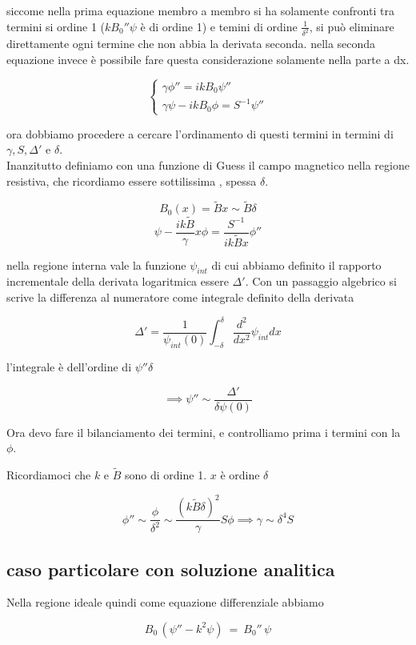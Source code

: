 siccome nella prima equazione membro a membro si ha solamente confronti tra termini si ordine 1 ($kB_0''\psi$ è di ordine 1) e temini di ordine $\frac{1}{\delta^2}$, si può eliminare direttamente ogni termine che non abbia la derivata seconda. nella seconda equazione invece è possibile fare  questa considerazione solamente nella parte a dx.

\[\begin{cases}
	\gamma\phi''=ikB_0\psi''\\\gamma\psi-ikB_0\phi=S^{-1}\psi''
\end{cases}\] 

ora dobbiamo procedere a cercare l'ordinamento di questi termini in termini di $\gamma, S, \Delta'  $ e $\delta$. \\Inanzitutto definiamo con una funzione di Guess il campo magnetico nella regione resistiva, che ricordiamo essere sottilissima , spessa $\delta$. 

\[B_0(x)=\tilde Bx\sim\tilde B\delta\]
\[\psi-\frac{ik\tilde B}{\gamma}x\phi=\frac{S^{-1}}{ik\tilde Bx}\phi''\] 

nella regione interna vale la funzione $\psi_{int}$ di cui abbiamo definito il rapporto incrementale della derivata logaritmica essere $\Delta'$. Con un passaggio algebrico si scrive la differenza al numeratore come integrale definito  della derivata 

\[\Delta'=\frac{1}{\psi_{int}(0)}\int_{-\delta}^{\delta}\frac{d^2}{dx^2}\psi_{int}dx\] 

l'integrale è dell'ordine di $\psi''\delta$

\[\implies\psi''\sim \frac{\Delta'}{\delta \psi(0)}\] 

Ora devo fare il bilanciamento dei termini, e controlliamo prima i termini con la $\phi$.         

Ricordiamoci che $k$ e $\tilde B$ sono di ordine 1.  $x $ è ordine $\delta$

\[\phi''\sim\frac{\phi}{\delta^2}\sim\frac{(k\tilde B \delta)^2}{\gamma}S\phi\implies\gamma\sim\delta^4 S\] 



\subsection{caso particolare con soluzione analitica}

Nella regione ideale quindi come equazione differenziale abbiamo 

\[B_0\, (\psi''-k^2\psi)\ =\ B_0''\, \psi\] 


